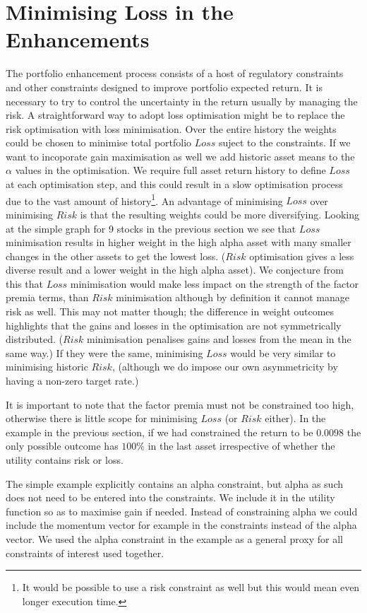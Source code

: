\documentclass[12pt]{article}
\begin{document}
\section{Minimising Loss in the Enhancements}
The portfolio enhancement process consists of a host of regulatory constraints and other constraints 
designed to improve portfolio expected return. It is necessary to try to control the uncertainty in the return usually 
by managing the risk.
A straightforward way to adopt loss optimisation might be to replace the risk optimisation with loss minimisation.
Over the entire history the weights could be chosen to minimise total portfolio $Loss$ suject to the constraints.
If we want to incoporate gain maximisation as well we add historic asset means to the $\alpha$ values in the 
optimisation.
We require full asset return history to define $Loss$ at each optimisation step,
and this could 
result in a slow optimisation process due to the vast amount of history\footnote{It would be possible 
to use a risk constraint as well but this would mean even longer execution time.}.  An advantage of
minimising $Loss$ over minimising $Risk$ is that the resulting weights could
be more diversifying. Looking at the simple graph for 9 stocks in the previous section we see that
$Loss$ minimisation results in higher weight in the high alpha asset with many 
smaller changes in the other assets to get the lowest loss. ($Risk$ optimisation gives a less diverse
result and a lower weight in the high alpha asset). We conjecture from this that $Loss$ minimisation 
would make less impact on the strength of the factor premia terms, than $Risk$ minimisation although by definition it cannot
manage risk as well. This may not matter though; the difference in weight outcomes
highlights that the gains and losses in the optimisation are not symmetrically
distributed. ($Risk$ minimisation penalises gains and losses from the mean in the same way.) If they were the same, minimising $Loss$ would be very similar to minimising historic $Risk$, (although
we do impose our own asymmetricity by having a non-zero target rate.) 

It is important
to note that the factor premia must not be constrained too high, otherwise there is little scope 
for minimising $Loss$ (or $Risk$ either). In the example in the previous section,
if we had constrained the return to be $0.0098$ the only possible outcome has $100\%$ in 
the last asset irrespective of whether the utility contains risk or loss.

The simple example explicitly contains an alpha constraint, but alpha as such does not need to 
be entered into the constraints. We include it in the utility function so as to maximise gain if needed. 
Instead of constraining alpha we could include the momentum 
vector for example in the constraints instead of the alpha vector. We used the alpha constraint in the example as a general proxy for all 
constraints of interest used together.
\end{document}
